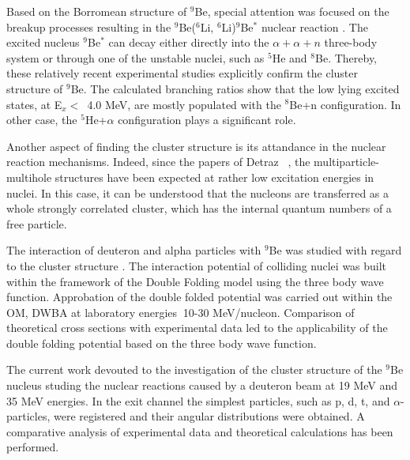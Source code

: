 \documentclass[10pt]{iopart}
\begin{document}
Based on the Borromean structure of $^9$Be, special attention was focused on the breakup processes resulting in the $^9$Be($^6$Li, $^6$Li)$^9$Be$^*$ nuclear reaction \cite{brown2007, papka2007}. The excited nucleus $^9$Be$^*$ can decay either directly into the $\alpha+\alpha+n$ three-body system or through one of the unstable nuclei, such as $^5$He and $^8$Be. Thereby, these relatively recent experimental studies explicitly confirm the cluster structure of $^9$Be.
The calculated branching ratios  show that the low lying excited states, at E$_x <$~4.0 MeV,  are mostly populated with the $^8$Be+n configuration. In other case, the $^5$He+$\alpha$ configuration plays a significant  role.

Another aspect of finding the cluster structure is its attandance in the nuclear reaction mechanisms. Indeed, since the papers of Detraz \etal~\cite{detraz1970, detraz1974}, the multiparticle-multihole structures have been expected at rather low excitation energies in nuclei. In this case, it can be understood that the nucleons are transferred as a whole strongly correlated cluster, which has the internal quantum numbers of a free particle.

The interaction of deuteron and alpha particles with $^9$Be was studied with regard to the cluster structure \cite{urazbekov2016, urazbekov2017}. The interaction potential of colliding nuclei was built within the framework of the Double Folding model using the three body wave function. Approbation of the double folded potential was carried out within the OM, DWBA at laboratory energies $~$10-30 MeV/nucleon. Comparison of theoretical cross sections with experimental data led to the applicability of the double folding potential based on the three body wave function.

The current work devouted to the investigation of the cluster structure of the $^9$Be nucleus studing the nuclear reactions caused by a deuteron beam at 19 MeV and 35 MeV energies. In the exit channel the simplest particles, such as p, d, t, and $\alpha$-particles, were registered and their angular distributions were obtained.
A comparative analysis of experimental data and theoretical calculations has been performed.
	
\end{document}
